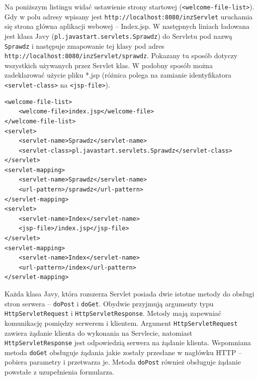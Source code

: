 \documentclass[eng,printmode,oneside]{mgr}
\begin{document}
Na poniższym listingu widać ustawienie strony startowej
(\texttt{<welcome-file-list>}). Gdy w polu adresy wpisany jest
\texttt{http://localhost:8080/inzServlet} uruchamia się strona główna aplikacji
webowej -- Index.jsp. W następnych liniach ładowana jest klasa
Javy (\texttt{pl.javastart.servlets.Sprawdz}) do Servletu pod nazwą
\texttt{Sprawdz} i następuje zmapowanie tej klasy pod adres
\texttt{http://localhost:8080/inzServlet/sprawdz}. Pokazany tu sposób dotyczy
wszystkich używanych przez Servlet klas. W podobny sposób można zadeklarować użycie
pliku *.jsp (różnica polega na zamianie identyfikatora \texttt{<servlet-class>}
na \texttt{<jsp-file>}). 

\lstset{language=XML,firstnumber=1,stepnumber=1}
\begin{lstlisting}[caption=Fragment pliku web.xml,label=lst:web.xml]
<welcome-file-list>
	<welcome-file>index.jsp</welcome-file>
</welcome-file-list>
<servlet>
	<servlet-name>Sprawdz</servlet-name>
	<servlet-class>pl.javastart.servlets.Sprawdz</servlet-class>
</servlet>
<servlet-mapping>
	<servlet-name>Sprawdz</servlet-name>
	<url-pattern>/sprawdz</url-pattern>
</servlet-mapping>
<servlet>
	<servlet-name>Index</servlet-name>
	<jsp-file>/index.jsp</jsp-file>
</servlet>
<servlet-mapping>
	<servlet-name>Index</servlet-name>
	<url-pattern>/index</url-pattern>
</servlet-mapping>
\end{lstlisting}

Każda klasa Javy, która rozszerza Servlet posiada dwie istotne metody do obsługi
stron serwera -- \texttt{doPost} i \texttt{doGet}. Obydwie przyjmują argumenty
typu \texttt{HttpServletRequest} i \texttt{HttpServletResponse}.
Metody mają zapewniać komunikację pomiędzy serwerem i klientem. Argument
\texttt{HttpServletRequest} zawiera żądanie klienta do wykonania na Servlecie,
natomiast \texttt{HttpServletResponse} jest odpowiedzią serwera na żądanie
klienta.
Wspomniana metoda \texttt{doGet} obsługuje żądania jakie zostały przesłane w
nagłówku HTTP -- pobiera parametry i przetwarza je. Metoda \texttt{doPost}
również obsługuje żądanie powstałe z uzupełnienia formularza.
\end{document}
